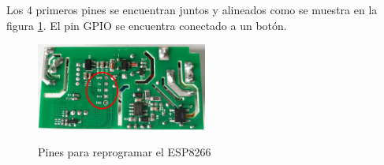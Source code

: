 \documentclass{article}
\begin{document}
Los 4 primeros pines se encuentran juntos y alineados como se muestra en la figura \ref{fig:pines}. El pin GPIO se encuentra conectado a un botón. 
\begin{figure}
\center
\includegraphics[width=0.5\textwidth]{imagenes/pines.jpg}
\label{fig:pines}
\caption{Pines para reprogramar el ESP8266}
\end{figure}
\end{document}
